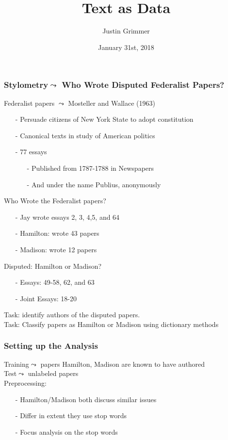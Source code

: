 \documentclass{beamer}
\title[Text as Data] %
{Text as Data}
\author{Justin Grimmer}
\institute[University of Chicago]{Associate Professor\\Department of Political Science \\  University of Chicago}
\date{January 31st, 2018}%
\numberwithin{equation}{section}
\begin{document}
\begin{frame}
\titlepage
\end{frame}





\begin{frame}
\frametitle{Stylometry$\leadsto$ Who Wrote Disputed Federalist Papers?}


Federalist papers $\leadsto$ Mosteller and Wallace (1963)
\begin{itemize}
\item[-] Persuade citizens of New York State to adopt constitution
\item[-] Canonical texts in study of American politics
\item[-] 77 essays
\begin{itemize}
\item[-] Published from 1787-1788 in Newspapers
\item[-] And under the name \alert{Publius}, anonymously
\end{itemize}
\end{itemize}
\alert{Who Wrote the Federalist papers}?
\begin{itemize}
\item[-] Jay wrote essays 2, 3, 4,5, and 64
\item[-] Hamilton: wrote 43 papers
\item[-] Madison: wrote 12 papers
\end{itemize}
\alert{Disputed:} Hamilton or Madison?
\begin{itemize}
\item[-] Essays: 49-58, 62, and 63
\item[-] Joint Essays: 18-20
\end{itemize}
\alert{Task}: identify authors of the disputed papers.  \\
\alert{Task}: Classify papers as Hamilton or Madison using dictionary methods

\end{frame}


\begin{frame}
\frametitle{Setting up the Analysis}


\alert{Training}$\leadsto$ papers Hamilton, Madison are known to have authored\\
\alert{Test}$\leadsto$ unlabeled papers\\
\alert{Preprocessing}:
\begin{itemize}
\item[-] Hamilton/Madison both discuss similar issues
\item[-] Differ in extent they use \alert{stop words}
\item[-] Focus analysis on the stop words
\end{itemize}


\end{frame}
\end{document}
